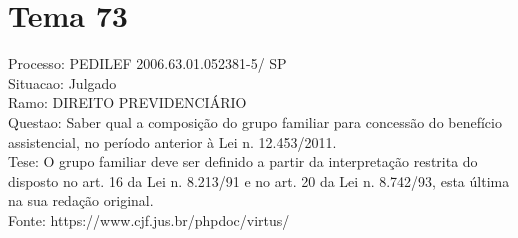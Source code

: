 \documentclass[12pt]{article}
\begin{document}
\section*{Tema 73}
Processo: PEDILEF 2006.63.01.052381-5/ SP\\
Situacao: Julgado\\
Ramo: DIREITO PREVIDENCIÁRIO\\
Questao: Saber qual a composição do grupo familiar para concessão do benefício assistencial, no período anterior à Lei n. 12.453/2011.\\
Tese: O grupo familiar deve ser definido a partir da interpretação restrita do disposto no art. 16 da Lei n. 8.213/91 e no art. 20 da Lei n. 8.742/93, esta última na sua redação original.\\
Fonte: https://www.cjf.jus.br/phpdoc/virtus/
\end{document}
